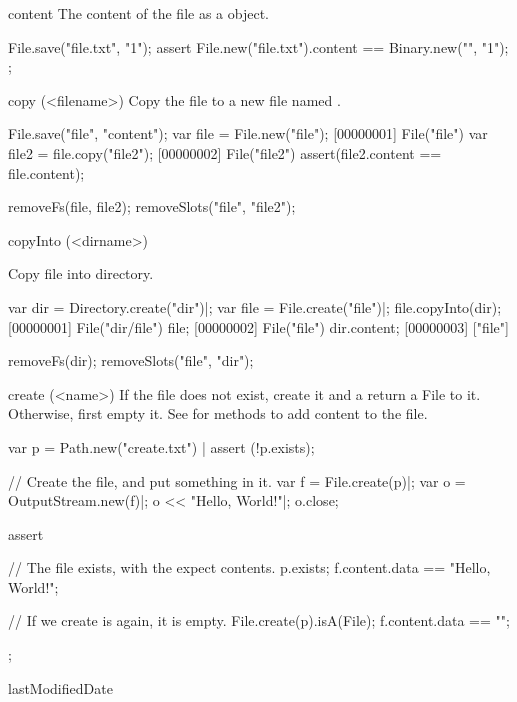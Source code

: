 \begin{urbiscriptapi}
\item[content]
  The content of the file as a  object.
\begin{urbiscript}
File.save("file.txt", "1\n");
assert
{
  File.new("file.txt").content == Binary.new("", "1\n");
};
\end{urbiscript}


\item[copy](<filename>)
  Copy the file to a new file named .
\begin{urbiscript}
File.save("file", "content");
var file = File.new("file");
[00000001] File("file")
var file2 = file.copy("file2");
[00000002] File("file2")
assert(file2.content == file.content);
\end{urbiscript}
\begin{urbicomment}
removeFs(file, file2);
removeSlots("file", "file2");
\end{urbicomment}


\item[copyInto](<dirname>)
  \experimental{}

  Copy file into  directory.
\begin{urbiscript}
var dir = Directory.create("dir")|;
var file = File.create("file")|;
file.copyInto(dir);
[00000001] File("dir/file")
file;
[00000002] File("file")
dir.content;
[00000003] ["file"]
\end{urbiscript}
\begin{urbicomment}
removeFs(dir);
removeSlots("file", "dir");
\end{urbicomment}


\item[create](<name>)%
  If the file  does not exist, create it and a return a File to
  it.  Otherwise, first empty it.  See  for methods
  to add content to the file.
\begin{urbiscript}
var p = Path.new("create.txt") |
assert (!p.exists);

// Create the file, and put something in it.
var f = File.create(p)|;
var o = OutputStream.new(f)|;
o << "Hello, World!"|;
o.close;

assert
{
  // The file exists, with the expect contents.
  p.exists;
  f.content.data == "Hello, World!";

  // If we create is again, it is empty.
  File.create(p).isA(File);
  f.content.data == "";
};
\end{urbiscript}


\item[lastModifiedDate]
  \experimental{}


\end{urbiscriptapi}
